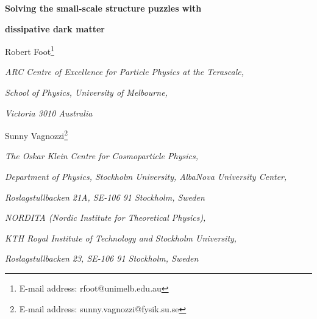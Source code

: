 \documentclass[12pt]{article}
\begin{document}

\renewcommand{\arraystretch}{2}

\begin{titlepage}
\vskip 0.8cm
\centerline{\Large \bf
Solving the small-scale structure puzzles with}
\vskip 0.3cm
\centerline{\Large \bf dissipative dark matter}

\vskip 0.8cm
\centerline{\large Robert Foot\footnote{E-mail address:
rfoot@unimelb.edu.au}}

\vskip 0.2cm
\centerline{\it ARC Centre of Excellence for Particle Physics at the
Terascale,}
\centerline{\it School of Physics, University of Melbourne,}
\centerline{\it Victoria 3010 Australia}
\vskip 0.5cm
\centerline{\large Sunny Vagnozzi\footnote{E-mail address: sunny.vagnozzi@fysik.su.se}}

\vskip 0.2cm
\centerline{\it The Oskar Klein Centre for Cosmoparticle Physics,}
\centerline{\it Department of Physics, Stockholm University, AlbaNova University Center,}
\centerline{\it Roslagstullbacken 21A, SE-106 91 Stockholm, Sweden}

\vskip 0.3cm
\centerline{\it NORDITA (Nordic Institute for Theoretical Physics),} 
\centerline{\it KTH Royal Institute of Technology and Stockholm University,}
\centerline{\it Roslagstullbacken 23, SE-106 91 Stockholm, Sweden}

\vskip 0.8cm
\noindent


\end{titlepage}
\end{document}
